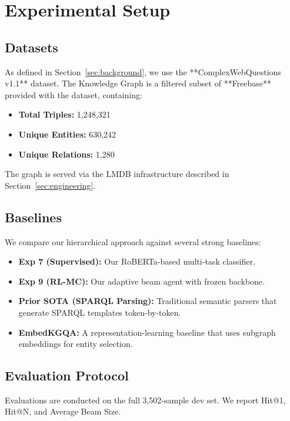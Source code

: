 \documentclass[11pt,a4paper]{article}
\makeatletter
\newcommand{\HitOne}{Hit@1}
\newcommand{\HitN}{Hit@N}
\makeatother
\begin{document}
\section{Experimental Setup}
\label{sec:setup}

\subsection{Datasets}
As defined in Section~\ref{sec:background}, we use the **ComplexWebQuestions
v1.1** dataset. The Knowledge Graph is a filtered subset of **Freebase**
provided with the dataset, containing:
\begin{itemize}
    \item \textbf{Total Triples:} 1,248,321
    \item \textbf{Unique Entities:} 630,242
    \item \textbf{Unique Relations:} 1,280
\end{itemize}
The graph is served via the LMDB infrastructure described in
Section~\ref{sec:engineering}.

\subsection{Baselines}
We compare our hierarchical approach against several strong baselines:
\begin{itemize}
    \item \textbf{Exp 7 (Supervised):} Our RoBERTa-based multi-task classifier.
    \item \textbf{Exp 9 (RL-MC):} Our adaptive beam agent with frozen backbone.
    \item \textbf{Prior SOTA (SPARQL Parsing):} Traditional semantic parsers that
          generate SPARQL templates token-by-token.
    \item \textbf{EmbedKGQA:} A representation-learning baseline that uses
          subgraph embeddings for entity selection.
\end{itemize}

\subsection{Evaluation Protocol}
Evaluations are conducted on the full 3,502-sample dev set. We report
\HitOne{}, \HitN{}, and Average Beam Size.
\end{document}
